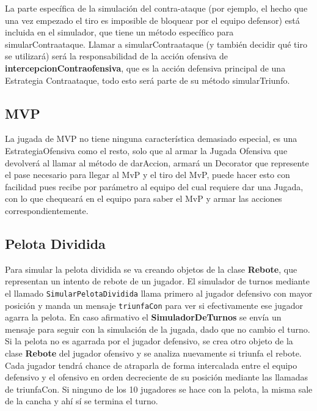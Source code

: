 La parte específica de la simulación del contra-ataque (por ejemplo, el hecho que una vez empezado el tiro es imposible de bloquear por el equipo defensor) está incluida en el simulador, que tiene un método específico para simularContraataque. Llamar a simularContraataque (y también decidir qué tiro se utilizará) será la responsabilidad de la acción ofensiva de \textbf{intercepcionContraofensiva}, que es la acción defensiva principal de una Estrategia Contraataque, todo esto será parte de su método simularTriunfo.

\subsection{MVP}

La jugada de MVP no tiene ninguna característica demasiado especial, es una 
EstrategiaOfensiva como el resto, solo que al armar la Jugada Ofensiva que 
devolverá al llamar al método de darAccion, armará un Decorator que represente 
el pase necesario para llegar al MvP y el tiro del MvP, puede hacer esto con 
facilidad pues recibe por parámetro al equipo del cual requiere dar una Jugada, 
con lo que chequeará en el equipo para saber el MvP y armar las acciones correspondientemente.

\subsection{Pelota Dividida}
Para simular la pelota dividida se va creando objetos de la clase \textbf{Rebote}, que representan
un intento de rebote de un jugador. El simulador de turnos mediante el llamado 
\texttt{SimularPelotaDividida} llama primero al jugador defensivo con mayor
 posición y manda un mensaje \texttt{triunfaCon} para ver si efectivamente ese jugador 
agarra la pelota.
En caso afirmativo el \textbf{SimuladorDeTurnos} se envía un mensaje 
para seguir con la simulación de la jugada, dado que no cambio el turno.
Si la pelota no es agarrada por el jugador defensivo, se crea otro objeto de la clase \textbf{Rebote}
del jugador ofensivo y se analiza nuevamente si triunfa el rebote.
Cada jugador tendrá chance de atraparla de forma intercalada entre el equipo 
defensivo y el ofensivo en orden decreciente de su posición mediante las 
llamadas de triunfaCon.
Si ninguno de los 10 jugadores se hace con la pelota, la misma sale de la 
cancha y ahí sí se termina el turno.

